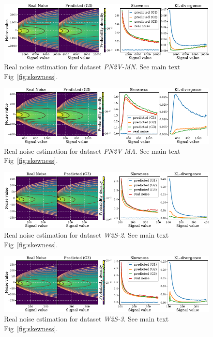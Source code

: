 \documentclass{article}
\begin{document}
\begin{figure}[ht]
\begin{center}
\centerline{\includegraphics[width=\columnwidth]{fig_skewness_1col_pn2v-MN.pdf}}
\caption{Real noise estimation for dataset \textit{PN2V-MN}. See main text Fig~\ref{fig:skewness}.
}
\end{center}
\end{figure}

\begin{figure}[ht]
\begin{center}
\centerline{\includegraphics[width=\columnwidth]{fig_skewness_1col_pn2v-MA.pdf}}
\caption{Real noise estimation for dataset \textit{PN2V-MA}. See main text Fig~\ref{fig:skewness}.
}
\end{center}
\end{figure}

\begin{figure}[ht]
\begin{center}
\centerline{\includegraphics[width=\columnwidth]{fig_skewness_1col_w2s-2.pdf}}
\caption{Real noise estimation for dataset \textit{W2S-2}. See main text Fig~\ref{fig:skewness}.
}
\end{center}
\end{figure}

\begin{figure}[ht]
\begin{center}
\centerline{\includegraphics[width=\columnwidth]{fig_skewness_1col_w2s-3.pdf}}
\caption{Real noise estimation for dataset \textit{W2S-3}. See main text Fig~\ref{fig:skewness}.
}
\end{center}
\end{figure}
\FloatBarrier
\end{document}
